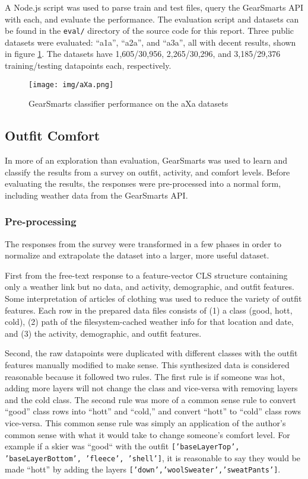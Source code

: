 A Node.js script was used to parse train and test files, query the GearSmarts API with each, and evaluate the performance.
The evaluation script and datasets can be found in the \texttt{eval/} directory of the source code for this report.
Three public datasets were evaluated: ``a1a'', ``a2a'', and ``a3a'', all with decent results, shown in figure \ref{fig:aXa}.
The datasets have 1,605/30,956, 2,265/30,296, and 3,185/29,376 training/testing datapoints each, respectively.

\begin{figure}[ht!]
    \centering
    \texttt{[image: img/aXa.png]}
    \caption{GearSmarts classifier performance on the aXa datasets}
    \label{fig:aXa}
\end{figure}

\subsection{Outfit Comfort}
In more of an exploration than evaluation, GearSmarts was used to learn and classify the results from a survey on
outfit, activity, and comfort levels. Before evaluating the results, the responses were pre-processed into a normal
form, including weather data from the GearSmarts API.

\subsubsection{Pre-processing}
\label{subsection:preprocessing}
The responses from the survey were transformed in a few phases in order to normalize and extrapolate the dataset into a
larger, more useful dataset.

First from the free-text response to a feature-vector CLS structure
containing only a weather link but no data, and activity, demographic, and outfit features. Some interpretation of articles of clothing
was used to reduce the variety of outfit features. Each row in the prepared data
files consists of (1) a class (good, hott, cold), (2) path of the filesystem-cached weather info for that location and
date, and (3) the activity, demographic, and outfit features.

Second, the raw datapoints were duplicated with different classes with the outfit features manually modified to make sense.
This synthesized data is considered reasonable because it followed two rules. The first rule is if someone was hot, adding
more layers will not change the class and vice-versa with removing layers and the cold class. The second rule was more of a
common sense rule to convert ``good'' class rows into ``hott'' and ``cold,'' and convert ``hott'' to ``cold'' class rows
vice-versa. This common sense rule was simply an application of the author's common sense with what it would take to
change someone's comfort level. For example if a skier was ``good`` with the outfit \texttt{['baseLayerTop', 'baseLayerBottom', 'fleece', 'shell']},
it is reasonable to say they would be made ``hott'' by adding the layers \texttt{['down','woolSweater','sweatPants']}.

